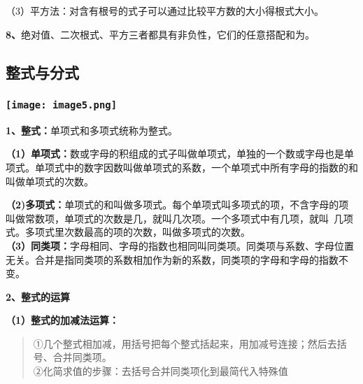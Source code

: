 （3）平方法：对含有根号的式子可以通过比较平方数的大小得根式大小。

\textbf{8、}绝对值、二次根式、平方三者都具有非负性，它们的任意搭配和为。

\hypertarget{ux6574ux5f0fux4e0eux5206ux5f0f}{%
\subsection{\texorpdfstring{
整式与分式}{ 整式与分式}}\label{ux6574ux5f0fux4e0eux5206ux5f0f}}

\hypertarget{ux5b66ux79d1ux7f51www.zxxk.com--ux6559ux80b2ux8d44ux6e90ux95e8ux6237ux63d0ux4f9bux8bd5ux9898ux8bd5ux5377ux6559ux6848ux8bfeux4ef6ux6559ux5b66ux8bbaux6587ux7d20ux6750ux7b49ux5404ux7c7bux6559ux5b66ux8d44ux6e90ux5e93ux4e0bux8f7dux8fd8ux6709ux5927ux91cfux4e30ux5bccux7684ux6559ux5b66ux8d44ux8baf-2}{%
\subsubsection{\texorpdfstring{\protect\texttt{[image: image5.png]}}{学科网(www.zxxk.com)-\/-教育资源门户，提供试题试卷、教案、课件、教学论文、素材等各类教学资源库下载，还有大量丰富的教学资讯！}}\label{ux5b66ux79d1ux7f51www.zxxk.com--ux6559ux80b2ux8d44ux6e90ux95e8ux6237ux63d0ux4f9bux8bd5ux9898ux8bd5ux5377ux6559ux6848ux8bfeux4ef6ux6559ux5b66ux8bbaux6587ux7d20ux6750ux7b49ux5404ux7c7bux6559ux5b66ux8d44ux6e90ux5e93ux4e0bux8f7dux8fd8ux6709ux5927ux91cfux4e30ux5bccux7684ux6559ux5b66ux8d44ux8baf-2}}

\textbf{1、整式：}单项式和多项式统称为整式。

\textbf{（1）单项式：}数或字母的积组成的式子叫做单项式，单独的一个数或字母也是单项式。单项式中的数字因数叫做单项式的系数，一个单项式中所有字母的指数的和叫做单项式的次数。

\textbf{（2)多项式：}单项式的和叫做多项式。每个单项式叫多项式的项，不含字母的项叫做常数项，单项式的次数是几，就叫几次项。一个多项式中有几项，就叫~几项式。多项式里次数最高的项的次数，叫做多项式的次数。\\
\textbf{（3）同类项：}字母相同、字母的指数也相同叫同类项。同类项与系数、字母位置无关。合并是指同类项的系数相加作为新的系数，同类项的字母和字母的指数不变。

\textbf{2、整式的运算}

\textbf{（1）整式的加减法运算：}

\begin{quote}
①几个整式相加减，用括号把每个整式括起来，用加减号连接；然后去括号、合并同类项。\\
②化简求值的步骤：去括号合并同类项化到最简代入特殊值
\end{quote}

